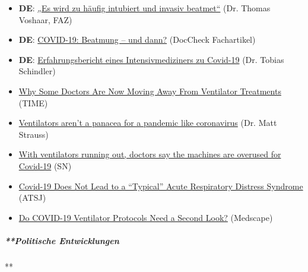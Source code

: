\begin{itemize}
\tightlist
\item
  \textbf{DE}:
  \href{https://www.vpneumo.de/fileadmin/pdf/f2004071.007_Voshaar.pdf}{„Es
  wird zu häufig intubiert und invasiv beatmet``} (Dr. Thomas Voshaar,
  FAZ)
\item
  \textbf{DE}:
  \href{https://www.doccheck.com/de/detail/articles/26271-covid-19-beatmung-und-dann}{COVID-19:
  Beatmung -- und dann?} (DocCheck Fachartikel)
\item
  \textbf{DE}:
  \href{https://www.frankenpost.de/region/oberfranken/laenderspiegel/Gefahr-durch-das-Beatmungsgeraet;art2388,7210803}{Erfahrungsbericht
  eines Intensivmediziners zu Covid-19} (Dr. Tobias Schindler)
\item
  \href{https://time.com/5818547/ventilators-coronavirus/}{Why Some
  Doctors Are Now Moving Away From Ventilator Treatments} (TIME)
\item
  \href{https://www.spectator.co.uk/article/Ventilators-aren-t-a-panacea-for-a-pandemic-like-coronavirus}{Ventilators
  aren't a panacea for a pandemic like coronavirus} (Dr. Matt Strauss)
\item
  \href{https://www.statnews.com/2020/04/08/doctors-say-ventilators-overused-for-covid-19/}{With
  ventilators running out, doctors say the machines are overused for
  Covid-19} (SN)
\item
  \href{https://www.atsjournals.org/doi/pdf/10.1164/rccm.202003-0817LE}{Covid-19
  Does Not Lead to a ``Typical'' Acute Respiratory Distress Syndrome}
  (ATSJ)
\item
  \href{https://www.medscape.com/viewarticle/928156}{Do COVID-19
  Ventilator Protocols Need a Second Look?} (Medscape)
\end{itemize}

\hypertarget{politische-entwicklungen}{%
\subparagraph{**Politische
Entwicklungen}\label{politische-entwicklungen}}

**

